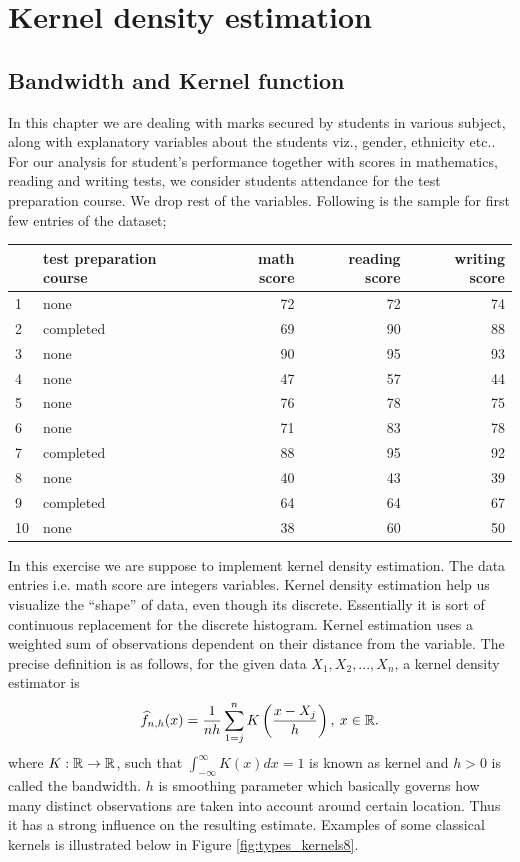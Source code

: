 \chapter{Kernel density estimation}
\section{Bandwidth and Kernel function}
In this chapter we are dealing with marks secured by students in various subject, along with  explanatory variables about the students viz., gender, ethnicity etc.. For our analysis for student's performance together with scores in mathematics, reading and writing tests, we consider students attendance for the test preparation course. We drop rest of the variables. Following is the sample for first few entries of the dataset;

\begin{table}[ht]
\centering
\begin{tabular}{llrrr}
  \hline
 & test preparation course & math score & reading score & writing score \\ 
  \hline
1 & none &  72 &  72 &  74 \\ 
  2 & completed &  69 &  90 &  88 \\ 
  3 & none &  90 &  95 &  93 \\ 
  4 & none &  47 &  57 &  44 \\ 
  5 & none &  76 &  78 &  75 \\ 
  6 & none &  71 &  83 &  78 \\ 
  7 & completed &  88 &  95 &  92 \\ 
  8 & none &  40 &  43 &  39 \\ 
  9 & completed &  64 &  64 &  67 \\ 
  10 & none &  38 &  60 &  50 \\ 
   \hline
\end{tabular}
\end{table}

In this exercise we are suppose to implement kernel density estimation. The data entries i.e. math score are integers variables. Kernel density estimation help us visualize the “shape” of data, even though its discrete. Essentially it is sort of continuous replacement for the discrete histogram. Kernel estimation uses a weighted sum of observations dependent on their distance from the variable. The precise definition is as follows, for the given data $X_1, X_2,..., X_n$, a kernel density estimator is 
$$\widehat{f}_{n,h}(x)= \frac{1}{nh}\sum_{1 = j}^n K\left(\frac{x-X_j}{h}\right), \: x\in \mathbb{R} .$$ 
where $K: \mathbb{R} \rightarrow \mathbb{R}$, such that $\int_{-\infty}^{\infty}K(x)dx=1$ is known as kernel and $h>0$ is called the bandwidth. $h$ is smoothing parameter which basically governs how many distinct observations are taken into account around certain location. Thus it has a strong influence on the resulting estimate. Examples of some classical kernels is illustrated below in Figure \ref{fig:types_kernels8}.
    
